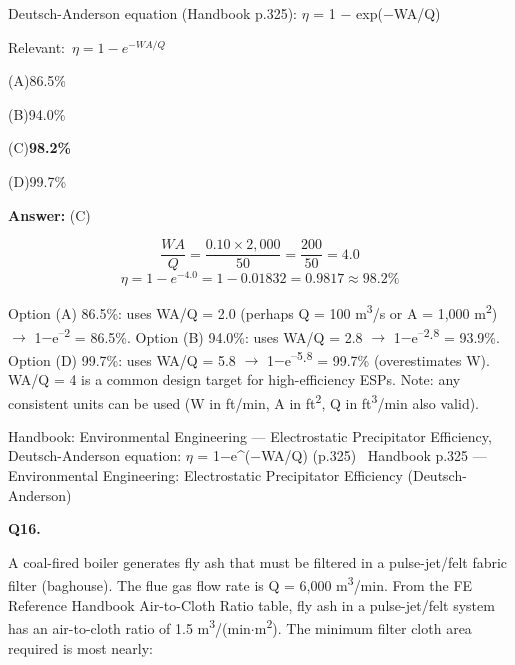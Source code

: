\documentclass[11pt]{article}
\newcommand{\correct}[1]{\textbf{#1}\;{\color{accent}$\checkmark$}}
\newcommand{\optline}[2]{\par\noindent\hspace{1.2em}(#1)\hspace{0.6em}#2}
\begin{document}
Deutsch-Anderson equation (Handbook p.325):
$\eta$ = 1 $-$ exp($-$WA/Q)\par\vspace{3pt}
{\small\color{soft}Relevant:}\ $\eta = 1 - e^{-WA/Q}$\par\vspace{3pt}
\optline{A}{86.5\%}
\optline{B}{94.0\%}
\optline{C}{\correct{98.2\%}}
\optline{D}{99.7\%}
\par\vspace{3pt}
\vspace{2pt}\par\noindent\colorbox{boxbg}{\parbox{\dimexpr\linewidth-2\fboxsep\relax}{%
\vspace{2pt}\textbf{Answer:} (C)\par\vspace{2pt}
{\small \[\frac{WA}{Q} = \frac{0.10 \times 2{,}000}{50} = \frac{200}{50} = 4.0\]
\[\eta = 1 - e^{-4.0} = 1 - 0.01832 = 0.9817 \approx 98.2\%\]

Option (A) 86.5\%: uses WA/Q = 2.0 (perhaps Q = 100 m\textsuperscript{3}/s or A = 1,000 m\textsuperscript{2}) $\rightarrow$ 1$-$e\textsuperscript{--}\textsuperscript{2} = 86.5\%. Option (B) 94.0\%: uses WA/Q = 2.8 $\rightarrow$ 1$-$e\textsuperscript{--}\textsuperscript{2}$\cdot$\textsuperscript{8} = 93.9\%. Option (D) 99.7\%: uses WA/Q = 5.8 $\rightarrow$ 1$-$e\textsuperscript{--}\textsuperscript{5}$\cdot$\textsuperscript{8} = 99.7\% (overestimates W). WA/Q = 4 is a common design target for high-efficiency ESPs. Note: any consistent units can be used (W in ft/min, A in ft\textsuperscript{2}, Q in ft\textsuperscript{3}/min also valid).}\par\vspace{2pt}
{\footnotesize\color{soft}Handbook: Environmental Engineering --- Electrostatic Precipitator Efficiency, Deutsch-Anderson equation: $\eta$ = 1$-$e\textasciicircum{}($-$WA/Q) (p.325) \textbullet\ Handbook p.325 --- Environmental Engineering: Electrostatic Precipitator Efficiency (Deutsch-Anderson)}\vspace{2pt}
}}
\vspace{9pt}
\filbreak
\textbf{\color{accent}Q16.}\par\vspace{2pt}
A coal-fired boiler generates fly ash that must be filtered in a pulse-jet/felt fabric filter (baghouse). The flue gas flow rate is Q = 6,000 m\textsuperscript{3}/min. From the FE Reference Handbook Air-to-Cloth Ratio table, fly ash in a pulse-jet/felt system has an air-to-cloth ratio of 1.5 m\textsuperscript{3}/(min$\cdot$m\textsuperscript{2}). The minimum filter cloth area required is most nearly:
\end{document}
